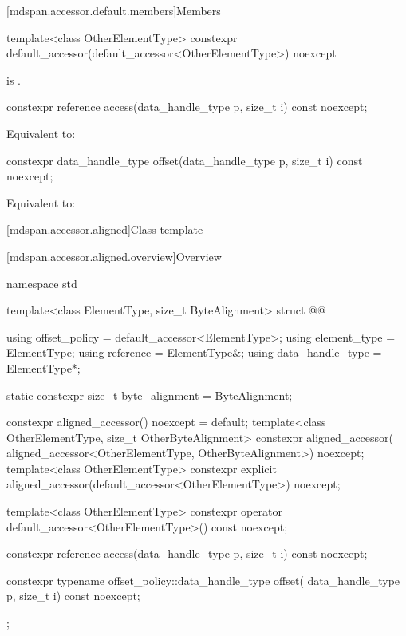 [mdspan.accessor.default.members]{Members}

%
\begin{itemdecl}
template<class OtherElementType>
  constexpr default_accessor(default_accessor<OtherElementType>) noexcept {}
\end{itemdecl}

\begin{itemdescr}
\pnum
\constraints
{}
is .
\end{itemdescr}

%
\begin{itemdecl}
constexpr reference access(data_handle_type p, size_t i) const noexcept;
\end{itemdecl}

\begin{itemdescr}
\pnum
\effects
Equivalent to: 
\end{itemdescr}

%
\begin{itemdecl}
constexpr data_handle_type offset(data_handle_type p, size_t i) const noexcept;
\end{itemdecl}

\begin{itemdescr}
\pnum
\effects
Equivalent to: 
\end{itemdescr}

[mdspan.accessor.aligned]{Class template }

[mdspan.accessor.aligned.overview]{Overview}

\begin{codeblock}
namespace std {
  template<class ElementType, size_t ByteAlignment>
  struct @@ {
    using offset_policy = default_accessor<ElementType>;
    using element_type = ElementType;
    using reference = ElementType&;
    using data_handle_type = ElementType*;

    static constexpr size_t byte_alignment = ByteAlignment;

    constexpr aligned_accessor() noexcept = default;
    template<class OtherElementType, size_t OtherByteAlignment>
      constexpr aligned_accessor(
        aligned_accessor<OtherElementType, OtherByteAlignment>) noexcept;
    template<class OtherElementType>
      constexpr explicit aligned_accessor(default_accessor<OtherElementType>) noexcept;

    template<class OtherElementType>
      constexpr operator default_accessor<OtherElementType>() const noexcept;

    constexpr reference access(data_handle_type p, size_t i) const noexcept;

    constexpr typename offset_policy::data_handle_type offset(
      data_handle_type p, size_t i) const noexcept;
  };
}
\end{codeblock}

